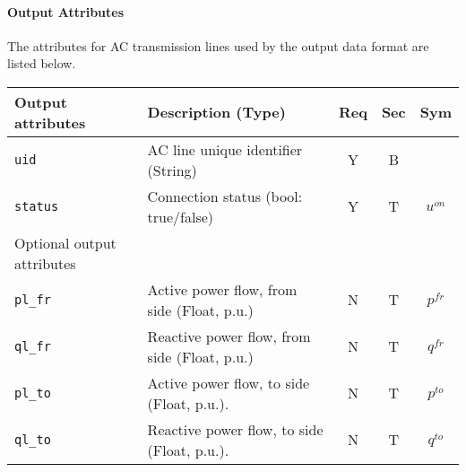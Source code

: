 \documentclass{article}
\begin{document}


\paragraph{Output Attributes}
The attributes for AC transmission lines used by the output data format are listed below.
\begin{center}
\small
\begin{tabular}{ l | l | c | c | c |}
Output attributes & Description (Type)& Req & Sec & Sym\\
\hline
 {\tt uid} & AC line unique identifier (String)& Y & B & \\
 {\tt status} & Connection status (bool: true/false) & Y & T & $u^{on}$ \\  
\hline
  Optional output attributes &   &  & & \\
\hline
 {\tt pl\_fr} & Active power flow, from side (Float, p.u.)  & N & T & $p^{fr}$ \\
 {\tt ql\_fr} & Reactive power flow, from side (Float, p.u.)& N & T & $q^{fr}$ \\
 {\tt pl\_to} & Active power flow, to side (Float, p.u.).   & N & T & $p^{to}$ \\
 {\tt ql\_to} & Reactive power flow, to side (Float, p.u.). & N & T & $q^{to}$ \\
\hline 
\end{tabular}
\end{center}
\end{document}
